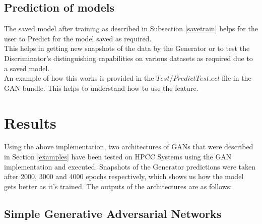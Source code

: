 \documentclass[conference]{IEEEtran}
\begin{document}
\subsection{Prediction of models}

The saved model after training as described in Subsection \ref{savetrain} helps for the user to Predict for the model saved as required.
\\
This helps in getting new snapshots of the data by the Generator or to test the Discriminator's distinguishing capabilities on various datasets as required due to a saved model. 
\\
An example of how this works is provided in the $Test/PredictTest.ecl$ file in the GAN bundle. This helps to understand how to use the feature. 

\FloatBarrier
\section{Results}\label{results}

Using the above implementation, two architectures of GANs that were described in Section \ref{examples} have been tested on HPCC Systems using the GAN implementation and executed. Snapshots of the Generator predictions were taken after 2000, 3000 and 4000 epochs respectively, which shows us how the model gets better as it's trained. The outputs of the architectures are as follows:

\subsection{Simple Generative Adversarial Networks}\label{gan_results}
\end{document}
